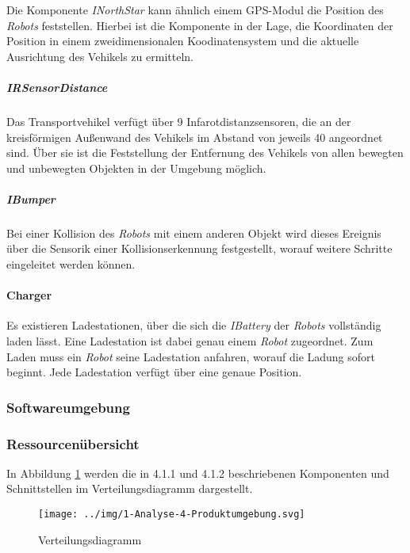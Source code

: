     Die Komponente \emph{INorthStar} kann ähnlich einem GPS-Modul die
    Position des \emph{Robots} feststellen. Hierbei ist die Komponente in
    der Lage, die Koordinaten der Position in einem zweidimensionalen
    Koodinatensystem und die aktuelle Ausrichtung des Vehikels zu ermitteln.

    \subparagraph{IRSensorDistance}\label{irsensordistance} \newline

    Das Transportvehikel verfügt über 9 Infarotdistanzsensoren, die an der
    kreisförmigen Außenwand des Vehikels im Abstand von jeweils 40
    angeordnet sind. Über sie ist die Feststellung der Entfernung des
    Vehikels von allen bewegten und unbewegten Objekten in der Umgebung
    möglich.

    \subparagraph{IBumper}\label{ibumper} \newline

    Bei einer Kollision des \emph{Robots} mit einem anderen Objekt wird
    dieses Ereignis über die Sensorik einer Kollisionserkennung festgestellt, worauf
    weitere Schritte eingeleitet werden können.

    \paragraph{Charger}\label{charger} \newline

    Es existieren Ladestationen, über die sich die \emph{IBattery} der
    \emph{Robots} vollständig laden lässt. Eine Ladestation ist dabei genau
    einem \emph{Robot} zugeordnet. Zum Laden muss ein \emph{Robot} seine
    Ladestation anfahren, worauf die Ladung sofort beginnt. Jede Ladestation
    verfügt über eine genaue Position.

    \subsubsection{Softwareumgebung}



\subsubsection{Ressourcenübersicht}
    In Abbildung \ref{fig:4-1-3-verteilungsdiagramm} werden die in 4.1.1 und 4.1.2 beschriebenen
    Komponenten und Schnittstellen im Verteilungsdiagramm dargestellt.

    \begin{figure}[H]
      \centering
      \texttt{[image: ../img/1-Analyse-4-Produktumgebung.svg]}
      \caption{Verteilungsdiagramm}
      \label{fig:4-1-3-verteilungsdiagramm}
    \end{figure}
